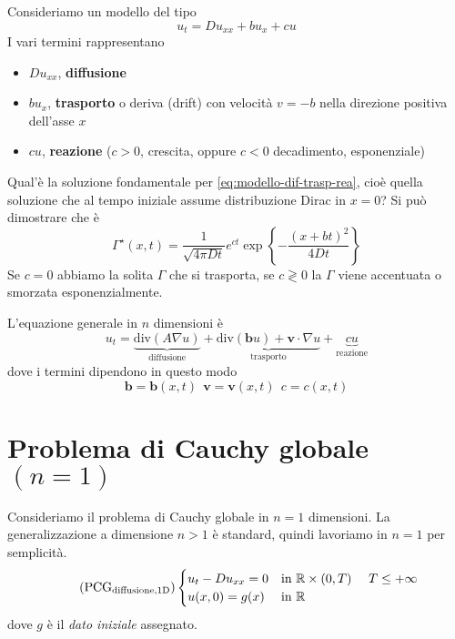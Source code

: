 Consideriamo un modello del tipo
\begin{equation}
    u_{t} =Du_{xx} +bu_{x} +cu
    \label{eq:modello-dif-trasp-rea}
\end{equation}
I vari termini rappresentano
\begin{itemize}
    \item $Du_{xx}$, \textbf{diffusione}
    \item $bu_{x}$, \textbf{trasporto} o deriva (drift) con velocità $v=-b$ nella direzione positiva dell'asse $x$
    \item $cu$, \textbf{reazione} ($c >0$, crescita, oppure $c< 0$ decadimento, esponenziale)
\end{itemize}

Qual'è la soluzione fondamentale per \eqref{eq:modello-dif-trasp-rea}, cioè quella soluzione che al tempo iniziale assume distribuzione Dirac in $x=0$? Si può dimostrare che è
\begin{equation}
    \boxed{\Gamma ^{\star }(x,t) =\frac{1}{\sqrt{4\pi Dt}} e^{ct}\exp\left\{-\frac{(x+bt)^{2}}{4Dt}\right\}}
\end{equation}
Se $c=0$ abbiamo la solita $\Gamma $ che si trasporta, se $c\gtrless 0$ la $\Gamma $ viene accentuata o smorzata esponenzialmente.

L'equazione generale in $n$ dimensioni è
\begin{equation*}
    u_{t} = \underbrace{\mathrm{div}(A \nabla u)}_{\text{diffusione}} + \underbrace{\mathrm{div}(\mathbf{b} u) +\mathbf{v} \cdot\nabla u}_{\text{trasporto}} + \underbrace{cu}_{\text{reazione}}
\end{equation*}
dove i termini dipendono in questo modo
\begin{equation*}
    \mathbf{b} =\mathbf{b}(x,t) \ \ \mathbf{v} =\mathbf{v}(x,t) \ \ c=c(x,t)
\end{equation*}
\section{Problema di Cauchy globale \texorpdfstring{$(n=1)$}{n=1}}

Consideriamo il problema di Cauchy globale in $n=1$ dimensioni. La generalizzazione a dimensione $n >1$ è standard, quindi lavoriamo in $n=1$ per semplicità.
\begin{equation*}
    \tag{PCG$_{\text{diffusione,1D}}$}
    \begin{cases}
        u_{t} -Du_{xx} =0 & \text{in} \ \mathbb{R} \times (0,T) \ \ \ \ T\leq +\infty \\
        u(x,0) =g(x)      & \text{in} \ \mathbb{R}
    \end{cases}
    \label{eq:pcg-diffusione-1d}
\end{equation*}
dove $g$ è il \textit{dato iniziale} assegnato.

